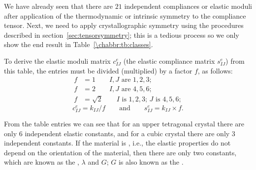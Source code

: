 We have already seen that there are $21$ independent compliances or elastic moduli after application of the thermodynamic or intrinsic symmetry to the compliance tensor.  Next, we need to apply crystallographic symmetry using the procedures described in section~\ref{sec:tensorsymmetry}; this is a tedious process so we only show the end result in Table~\ref{\chabbr:tb:classes}. 

To derive the elastic moduli matrix $c^e_{IJ}$ (the elastic compliance matrix $s^e_{IJ}$) from this table, the entries must be divided (multiplied) by a factor $f$, as follows:
\begin{align*}
	f &= 1\qquad\mbox{$I,J$ are $1,2,3$};\\
	f &= 2\qquad\mbox{$I,J$ are $4,5,6$};\\
	f &= \sqrt{2}\qquad\mbox{$I$ is $1,2,3$; $J$ is $4,5,6$};
\end{align*}
\[
	c^e_{IJ} = k_{IJ}/f\qquad\mbox{and}\qquad s^e_{IJ} = k_{IJ}\times f.
\]

From the table entries we can see that for an upper tetragonal crystal there are only 6 independent elastic constants, and for a cubic crystal there are only 3 independent constants.  If the material is , i.e., the elastic properties do not depend on the orientation of the material, then there are only two constants, which are known as the , $\lambda$ and $G$;  $G$ is also known as the .


